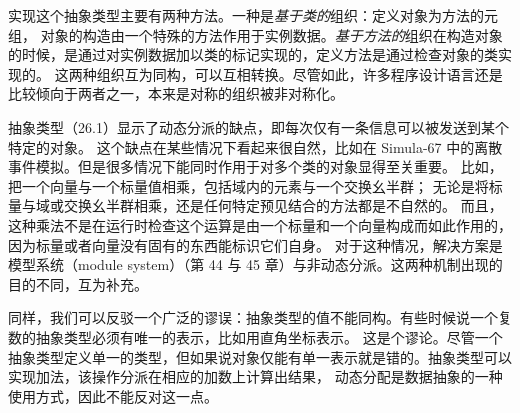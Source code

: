 实现这个抽象类型主要有两种方法。一种是\textit{基于类的}组织：定义对象为方法的元组，
对象的构造由一个特殊的方法作用于实例数据。\textit{基于方法的}组织在构造对象的时候，是通过对实例数据加以类的标记实现的，定义方法是通过检查对象的类实现的。
这两种组织互为同构，可以互相转换。尽管如此，许多程序设计语言还是比较倾向于两者之一，本来是对称的组织被非对称化。

抽象类型（26.1）显示了动态分派的缺点，即每次仅有一条信息可以被发送到某个特定的对象。
这个缺点在某些情况下看起来很自然，比如在 Simula-67 中的离散事件模拟。但是很多情况下能同时作用于对多个类的对象显得至关重要。
比如，把一个向量与一个标量值相乘，包括域内的元素与一个交换幺半群；%
无论是将标量与域或交换幺半群相乘，还是任何特定预见结合的方法都是不自然的。%
而且，这种乘法不是在运行时检查这个运算是由一个标量和一个向量构成而如此作用的，因为标量或者向量没有固有的东西能标识它们自身。
对于这种情况，解决方案是模型系统（module system）（第 44 与 45 章）与非动态分派。这两种机制出现的目的不同，互为补充。

同样，我们可以反驳一个广泛的谬误：抽象类型的值不能同构。有些时候说一个复数的抽象类型必须有唯一的表示，比如用直角坐标表示。
这是个谬论。尽管一个抽象类型定义单一的类型，但如果说对象仅能有单一表示就是错的。抽象类型可以实现加法，该操作分派在相应的加数上计算出结果，
动态分配是数据抽象的一种使用方式，因此不能反对这一点。%
